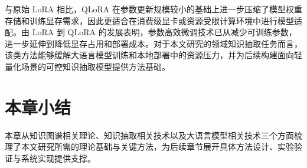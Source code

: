 与原始 LoRA 相比，QLoRA 在参数更新规模较小的基础上进一步压缩了模型权重存储和训练显存需求，因此更适合在消费级显卡或资源受限计算环境中进行模型适配。由 LoRA 到 QLoRA 的发展表明，参数高效微调技术已从减少可训练参数，进一步延伸到降低显存占用和部署成本。对于本文研究的领域知识抽取任务而言，该类方法能够缓解大语言模型训练和本地部署中的资源压力，并为后续构建面向轻量化场景的可控知识抽取模型提供方法基础。

\section{本章小结}

本章从知识图谱相关理论、知识抽取相关技术以及大语言模型相关技术三个方面梳理了本文研究所需的理论基础与关键方法，为后续章节展开具体方法设计、实验验证与系统实现提供支撑。

